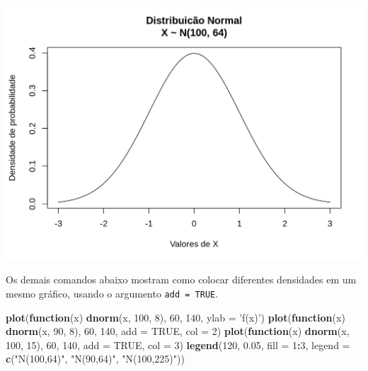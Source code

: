 \documentclass[10pt,a4paper]{book}
\newenvironment{Shaded}{\begin{snugshade}}{\end{snugshade}}
\newcommand{\KeywordTok}[1]{\textcolor[rgb]{0.13,0.29,0.53}{\textbf{#1}}}
\newcommand{\DataTypeTok}[1]{\textcolor[rgb]{0.13,0.29,0.53}{#1}}
\newcommand{\DecValTok}[1]{\textcolor[rgb]{0.00,0.00,0.81}{#1}}
\newcommand{\FloatTok}[1]{\textcolor[rgb]{0.00,0.00,0.81}{#1}}
\newcommand{\StringTok}[1]{\textcolor[rgb]{0.31,0.60,0.02}{#1}}
\newcommand{\OtherTok}[1]{\textcolor[rgb]{0.56,0.35,0.01}{#1}}
\newcommand{\ControlFlowTok}[1]{\textcolor[rgb]{0.13,0.29,0.53}{\textbf{#1}}}
\newcommand{\OperatorTok}[1]{\textcolor[rgb]{0.81,0.36,0.00}{\textbf{#1}}}
\newcommand{\NormalTok}[1]{#1}
\begin{document}
\begin{center}\includegraphics{figures/unnamed-chunk-344-1} \end{center}

Os demais comandos abaixo mostram como colocar diferentes densidades em
um mesmo gráfico, usando o argumento \texttt{add\ =\ TRUE}.

\begin{Shaded}
\begin{Highlighting}[]
\KeywordTok{plot}\NormalTok{(}\ControlFlowTok{function}\NormalTok{(x) }\KeywordTok{dnorm}\NormalTok{(x, }\DecValTok{100}\NormalTok{, }\DecValTok{8}\NormalTok{), }\DecValTok{60}\NormalTok{, }\DecValTok{140}\NormalTok{, }\DataTypeTok{ylab =} \StringTok{'f(x)'}\NormalTok{)}
\KeywordTok{plot}\NormalTok{(}\ControlFlowTok{function}\NormalTok{(x) }\KeywordTok{dnorm}\NormalTok{(x, }\DecValTok{90}\NormalTok{, }\DecValTok{8}\NormalTok{), }\DecValTok{60}\NormalTok{, }\DecValTok{140}\NormalTok{, }\DataTypeTok{add =} \OtherTok{TRUE}\NormalTok{, }\DataTypeTok{col =} \DecValTok{2}\NormalTok{)}
\KeywordTok{plot}\NormalTok{(}\ControlFlowTok{function}\NormalTok{(x) }\KeywordTok{dnorm}\NormalTok{(x, }\DecValTok{100}\NormalTok{, }\DecValTok{15}\NormalTok{), }\DecValTok{60}\NormalTok{, }\DecValTok{140}\NormalTok{, }\DataTypeTok{add =} \OtherTok{TRUE}\NormalTok{, }\DataTypeTok{col =} \DecValTok{3}\NormalTok{)}
\KeywordTok{legend}\NormalTok{(}\DecValTok{120}\NormalTok{, }\FloatTok{0.05}\NormalTok{, }\DataTypeTok{fill =} \DecValTok{1}\OperatorTok{:}\DecValTok{3}\NormalTok{,}
       \DataTypeTok{legend =} \KeywordTok{c}\NormalTok{(}\StringTok{"N(100,64)"}\NormalTok{, }\StringTok{"N(90,64)"}\NormalTok{, }\StringTok{"N(100,225)"}\NormalTok{))}
\end{Highlighting}
\end{Shaded}
\end{document}
